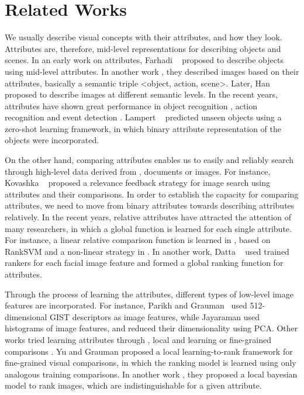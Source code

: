 

\section{Related Works}
\label{sec.2}

We usually describe visual concepts with their attributes, and how they look. Attributes are, therefore, mid-level representations for describing objects and scenes. In an early work on attributes, Farhadi \etal~\cite{Farhadi09describingobjects} proposed to describe objects using mid-level attributes. In another work \cite{farhadi10}, they described images based on their attributes, basically a semantic triple <object, action, scene>. Later, Han \etal~\cite{6739133} proposed to describe images at different semantic levels. In the recent years, attributes have shown great performance in object recognition \cite{Farhadi09describingobjects,7298613}, action recognition \cite{6838985,5995353} and event detection \cite{6475038}. Lampert \etal~\cite{6571196} predicted unseen objects using a zero-shot learning framework, in which binary attribute representation of the objects were incorporated. 

On the other hand, comparing attributes enables us to easily and reliably search through high-level data derived from \eg, documents or images. For instance, Kovashka \etal~\cite{KovashkaG13} proposed a relevance feedback strategy for image search using attributes and their comparisons. In order to establish the capacity for comparing attributes, we need to move from binary attributes towards describing attributes relatively. In the recent years, relative attributes have attracted the attention of many researchers, in which a global function is learned for each single attribute. For instance, a linear relative comparison function is learned in \cite{parikh2011}, based on RankSVM \cite{Joachims2002} and a non-linear strategy in \cite{Li2013}. In another work, Datta \etal~\cite{5771429} used trained rankers for each facial image feature and formed a global ranking function for attributes.

Through the process of learning the attributes, different types of low-level image features are incorporated. For instance, Parikh and Grauman~\cite{parikh2011} used 512-dimensional GIST \cite{Aude01} descriptors as image features, while Jayaraman \etal\cite{6909607} used histograms of image features, and reduced their dimensionality using PCA. Other works tried learning attributes through \eg, local and learning \cite{1641014} or fine-grained comparisons \cite{Yu2014}. Yu and Grauman \cite{Yu2014} proposed a local learning-to-rank framework for fine-grained visual comparisons, in which the ranking model is learned using only analogous training comparisons. In another work \cite{Yu2015}, they proposed a local bayesian model to rank images, which are indistinguishable for a given attribute. 

